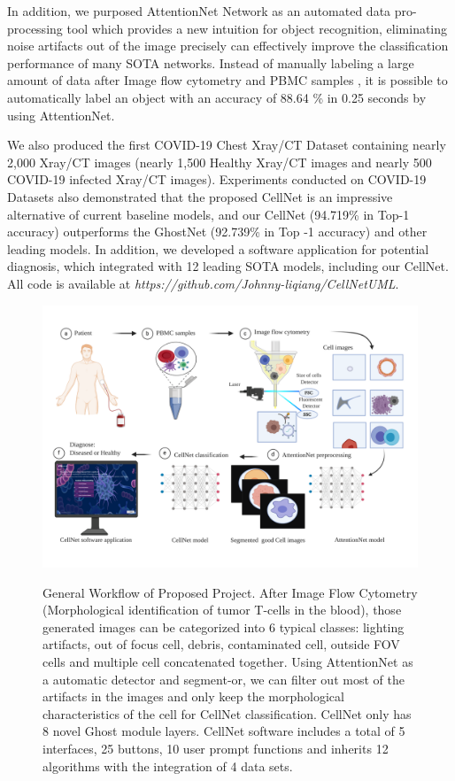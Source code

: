 In addition, we purposed AttentionNet Network as an automated data pro-processing tool which provides a new intuition for object recognition, eliminating noise artifacts out of the image precisely can effectively improve the classification performance of many SOTA networks. Instead of manually labeling a large amount of data after Image flow cytometry and PBMC samples \cite{12}, it is possible to automatically label an object with an accuracy of 88.64 \% in 0.25 seconds by using AttentionNet. 

We also produced the first COVID-19 Chest Xray/CT Dataset containing nearly 2,000 Xray/CT images (nearly 1,500 Healthy Xray/CT images and nearly 500 COVID-19 infected Xray/CT images). Experiments conducted on COVID-19 Datasets also demonstrated that the proposed CellNet is an impressive alternative of current baseline models, and our CellNet (94.719\% in Top-1 accuracy) outperforms the GhostNet\cite{19} (92.739\%  in Top -1 accuracy) and other leading models. In addition, we developed a software application for potential diagnosis, which integrated with 12 leading SOTA models, including our CellNet. All code is available at \textit{https://github.com/Johnny-liqiang/CellNetUML}.

\label{sub:figures}
\begin{figure}[t]
	\begin{center}
	\includegraphics[width=\textwidth]{thesis-template-master/images/general workflow2.pdf}
	\label{fig:lenna}
	\end{center}
	\caption{General Workflow of Proposed Project. After Image Flow Cytometry (Morphological identification of tumor T-cells in the blood), those generated images can be categorized into 6 typical classes: lighting artifacts, out of focus cell, debris, contaminated cell, outside FOV cells  and multiple cell concatenated together. Using AttentionNet as a automatic detector and segment-or, we can filter out most of the artifacts in the images and only keep the morphological characteristics of the cell for CellNet classification. CellNet only has 8 novel Ghost module layers. CellNet software includes a total of 5 interfaces, 25 buttons, 10 user prompt functions and inherits 12 algorithms with the integration of 4 data sets.}
	\label{fig:lennas}
\end{figure}

